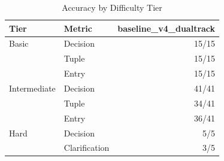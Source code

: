 \begin{table}[htbp]
\centering
\caption{Accuracy by Difficulty Tier}
\label{tab:tier-breakdown}
\begin{tabular}{ll r}
\toprule
Tier & Metric & baseline\_v4\_dualtrack \\
\midrule
  Basic & Decision & 15/15 \\
   & Tuple & 15/15 \\
   & Entry & 15/15 \\
  \midrule
  Intermediate & Decision & 41/41 \\
   & Tuple & 34/41 \\
   & Entry & 36/41 \\
  \midrule
  Hard & Decision & 5/5 \\
   & Clarification & 3/5 \\
\bottomrule
\end{tabular}
\end{table}
